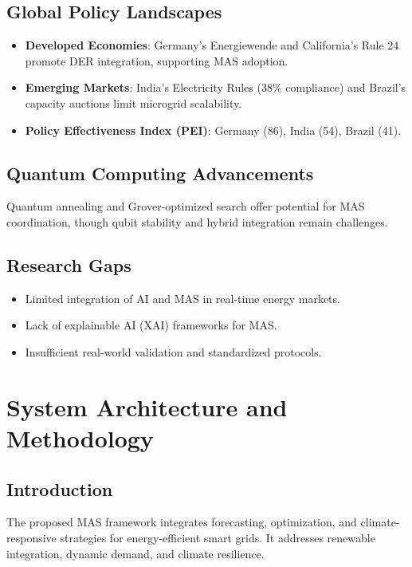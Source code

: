 \documentclass[12pt, a4paper, oneside]{book}
\begin{document}
\section{Global Policy Landscapes}
\begin{itemize}
    \item \textbf{Developed Economies}: Germany’s Energiewende and California’s Rule 24 promote DER integration, supporting MAS adoption.
    \item \textbf{Emerging Markets}: India’s Electricity Rules (38\% compliance) and Brazil’s capacity auctions limit microgrid scalability.
    \item \textbf{Policy Effectiveness Index (PEI)}: Germany (86), India (54), Brazil (41).
\end{itemize}

\section{Quantum Computing Advancements}
Quantum annealing and Grover-optimized search offer potential for MAS coordination, though qubit stability and hybrid integration remain challenges.

\section{Research Gaps}
\begin{itemize}
    \item Limited integration of AI and MAS in real-time energy markets.
    \item Lack of explainable AI (XAI) frameworks for MAS.
    \item Insufficient real-world validation and standardized protocols.
\end{itemize}

\chapter{System Architecture and Methodology}
\section{Introduction}
The proposed MAS framework integrates forecasting, optimization, and climate-responsive strategies for energy-efficient smart grids. It addresses renewable integration, dynamic demand, and climate resilience.
\end{document}

